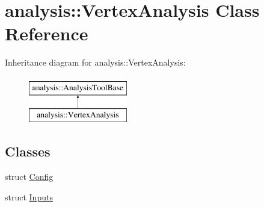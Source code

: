 \hypertarget{classanalysis_1_1VertexAnalysis}{}\section{analysis\+:\+:Vertex\+Analysis Class Reference}
\label{classanalysis_1_1VertexAnalysis}
Inheritance diagram for analysis\+:\+:Vertex\+Analysis\+:\begin{figure}[H]
\begin{center}
\leavevmode
\includegraphics[height=2.000000cm]{classanalysis_1_1VertexAnalysis}
\end{center}
\end{figure}
\subsection*{Classes}
\begin{DoxyCompactItemize}
\item 
struct \hyperlink{structanalysis_1_1VertexAnalysis_1_1Config}{Config}
\item 
struct \hyperlink{structanalysis_1_1VertexAnalysis_1_1Inputs}{Inputs}
\end{DoxyCompactItemize}
